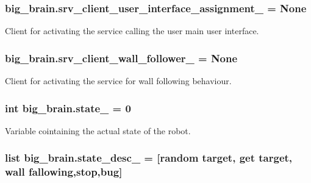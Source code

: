 \subsubsection[{\texorpdfstring{srv\+\_\+client\+\_\+user\+\_\+interface\+\_\+assignment\+\_\+}{srv_client_user_interface_assignment_}}]{\setlength{\rightskip}{0pt plus 5cm}big\+\_\+brain.\+srv\+\_\+client\+\_\+user\+\_\+interface\+\_\+assignment\+\_\+ = None}\hypertarget{namespacebig__brain_a946162ac048b8df1f02003b37bd96812}{}\label{namespacebig__brain_a946162ac048b8df1f02003b37bd96812}


Client for activating the service calling the user main user interface. 

\subsubsection[{\texorpdfstring{srv\+\_\+client\+\_\+wall\+\_\+follower\+\_\+}{srv_client_wall_follower_}}]{\setlength{\rightskip}{0pt plus 5cm}big\+\_\+brain.\+srv\+\_\+client\+\_\+wall\+\_\+follower\+\_\+ = None}\hypertarget{namespacebig__brain_a954157b5770aed51dc667611f39855b0}{}\label{namespacebig__brain_a954157b5770aed51dc667611f39855b0}


Client for activating the service for wall following behaviour. 

\subsubsection[{\texorpdfstring{state\+\_\+}{state_}}]{\setlength{\rightskip}{0pt plus 5cm}int big\+\_\+brain.\+state\+\_\+ = 0}\hypertarget{namespacebig__brain_a95db081b16847592a7981a7205e66358}{}\label{namespacebig__brain_a95db081b16847592a7981a7205e66358}


Variable cointaining the actual state of the robot. 

\subsubsection[{\texorpdfstring{state\+\_\+desc\+\_\+}{state_desc_}}]{\setlength{\rightskip}{0pt plus 5cm}list big\+\_\+brain.\+state\+\_\+desc\+\_\+ = \mbox{[}\textquotesingle{}random target\textquotesingle{}, \textquotesingle{}get target\textquotesingle{}, \textquotesingle{}wall fallowing\textquotesingle{},\textquotesingle{}stop\textquotesingle{},\textquotesingle{}bug\textquotesingle{}\mbox{]}}\hypertarget{namespacebig__brain_ab730e09c9bd7f5c7a1c09a8ea55a9029}{}\label{namespacebig__brain_ab730e09c9bd7f5c7a1c09a8ea55a9029}


